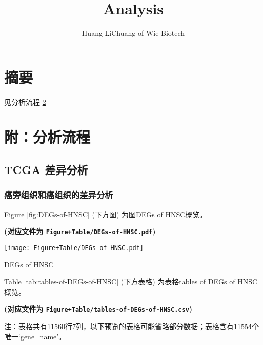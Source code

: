 \documentclass[
]{article}
\title{Analysis}
\author{Huang LiChuang of Wie-Biotech}
\date{}
\begin{document}
\maketitle

{
\setcounter{tocdepth}{4}
\tableofcontents
}
\listoffigures

\listoftables

\hypertarget{abstract}{%
\section{摘要}\label{abstract}}

见分析流程 \ref{workflow}

\hypertarget{workflow}{%
\section{附：分析流程}\label{workflow}}

\hypertarget{tcga-ux5deeux5f02ux5206ux6790}{%
\subsection{TCGA 差异分析}\label{tcga-ux5deeux5f02ux5206ux6790}}

\hypertarget{ux764cux65c1ux7ec4ux7ec7ux548cux764cux7ec4ux7ec7ux7684ux5deeux5f02ux5206ux6790}{%
\subsubsection{癌旁组织和癌组织的差异分析}\label{ux764cux65c1ux7ec4ux7ec7ux548cux764cux7ec4ux7ec7ux7684ux5deeux5f02ux5206ux6790}}

Figure \ref{fig:DEGs-of-HNSC} (下方图) 为图DEGs of HNSC概览。

\textbf{(对应文件为 \texttt{Figure+Table/DEGs-of-HNSC.pdf})}

\def\@captype{figure}
\begin{center}
\texttt{[image: Figure+Table/DEGs-of-HNSC.pdf]}
\caption{DEGs of HNSC}\label{fig:DEGs-of-HNSC}
\end{center}

Table \ref{tab:tables-of-DEGs-of-HNSC} (下方表格) 为表格tables of DEGs of HNSC概览。

\textbf{(对应文件为 \texttt{Figure+Table/tables-of-DEGs-of-HNSC.csv})}

\begin{center}\begin{tcolorbox}[colback=gray!10, colframe=gray!50, width=0.9\linewidth, arc=1mm, boxrule=0.5pt]注：表格共有11560行7列，以下预览的表格可能省略部分数据；表格含有11554个唯一`gene\_name'。
\end{tcolorbox}
\end{center}
\end{document}

